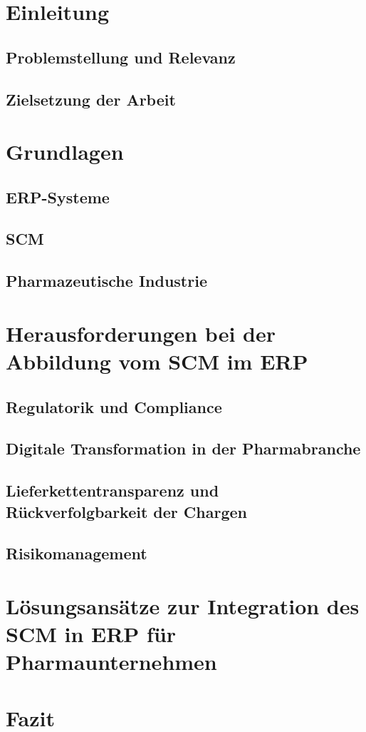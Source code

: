 \documentclass{article}
\begin{document}
\maketitle
\newpage
\tableofcontents
\newpage
\section{Einleitung}
\subsection{Problemstellung und Relevanz}
\subsection{Zielsetzung der Arbeit}
\section{Grundlagen}
\subsection{ERP-Systeme}
\subsection{SCM}
\subsection{Pharmazeutische Industrie}

\section{Herausforderungen bei der Abbildung vom SCM im ERP}
\subsection{Regulatorik und Compliance}
\subsection{Digitale Transformation in der Pharmabranche}
\subsection{Lieferkettentransparenz und Rückverfolgbarkeit der Chargen}
\subsection{Risikomanagement}

\section{Lösungsansätze zur Integration des SCM in ERP für Pharmaunternehmen}
\section{Fazit}
\subsection{}

\end{document}
